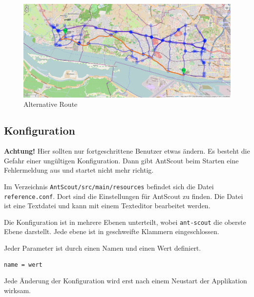 \begin{figure}[htbp]
  \centering
  \includegraphics[width=\textwidth]{Bilder/Alternative-Route.png}
  \caption{Alternative Route}
  \label{fig:alternative-route}
\end{figure}

\subsection{Konfiguration}
\label{sec:konfiguration}

\textbf{Achtung!}
Hier sollten nur fortgeschrittene Benutzer etwas ändern.
Es besteht die Gefahr einer ungültigen Konfiguration.
Dann gibt AntScout beim Starten eine Fehlermeldung aus und startet nicht mehr richtig.

Im Verzeichnis \texttt{AntScout/src/main/resources} befindet sich die Datei \texttt{reference.conf}.
Dort sind die Einstellungen für AntScout zu finden.
Die Datei ist eine Textdatei und kann mit einem Texteditor bearbeitet werden.

Die Konfiguration ist in mehrere Ebenen unterteilt, wobei \texttt{ant-scout} die oberste Ebene darstellt.
Jede ebene ist in geschweifte Klammern eingeschlossen.

Jeder Parameter ist durch einen Namen und einen Wert definiert.

\begin{lstlisting}
name = wert
\end{lstlisting}

Jede Änderung der Konfiguration wird erst nach einem Neustart der Applikation wirksam.

